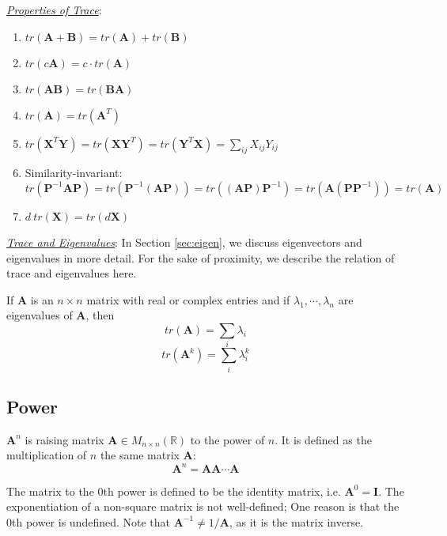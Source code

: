 \noindent\underline{\textit{Properties of Trace}}:
\begin{enumerate}[label=\alph*)]
    \item $tr(\bm{A}+\bm{B})=tr(\bm{A})+tr(\bm{B})$
    \item $tr(c\bm{A})=c\cdot tr(\bm{A})$
    \item $tr(\bm{AB})=tr(\bm{BA})$
    \item $tr(\bm{A})=tr(\bm{A}^T)$
    \item $tr(\bm{X}^T\bm{Y})=tr(\bm{XY}^T)=tr(\bm{Y}^T\bm{X})=\sum_{ij}X_{ij}Y_{ij}$
    \item Similarity-invariant:
        $$tr(\bm{P}^{-1}\bm{AP})=tr(\bm{P}^{-1}(\bm{AP}))=tr((\bm{AP})\bm{P}^{-1})=tr(\bm{A}(\bm{PP}^{-1}))=tr(\bm{A})$$
    \item $d\ tr(\bm{X})=tr(d\bm{X})$
\end{enumerate}

\noindent\underline{\textit{Trace and Eigenvalues}}:
In Section \ref{sec:eigen}, we discuss eigenvectors and eigenvalues in more detail. For the sake of proximity, we describe the relation of trace and eigenvalues here.

\begin{theorem}
If $\bm{A}$ is an $n\times n$ matrix with real or complex entries and if $\lambda_1,\cdots,\lambda_n$ are eigenvalues of $\bm{A}$, then
\begin{equation}
    tr(\bm{A})=\sum_i\lambda_i
\end{equation}
\begin{equation}
    tr(\bm{A}^k)=\sum_i\lambda_i^k
\end{equation}
\end{theorem}

\subsection{Power}
\begin{definition}
$\bm{A}^n$ is raising matrix $\bm{A}\in M_{n\times n}(\mathbb{R})$ to the power of $n$. It is defined as the multiplication of $n$ the same matrix $\bm{A}$:
\begin{equation}
    \bm{A}^n=\bm{AA}\cdots\bm{A}
\end{equation}
\end{definition}
 The matrix to the $0$th power is defined to be the identity matrix, i.e. $\bm{A}^0=\bm{I}$. The exponentiation of a non-square matrix is not well-defined; One reason is that the $0$th power is undefined. Note that $\bm{A}^{-1}\neq 1 / \bm{A}$, as it is the matrix inverse.
 

